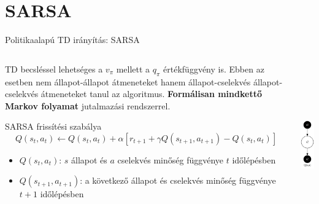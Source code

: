 \documentclass[english, aspectratio=169]{beamer}
\makeatletter
\let\origtableofcontents=\tableofcontents
\def\tableofcontents{\@ifnextchar[{\origtableofcontents}{\gobbletableofcontents}}
\def\gobbletableofcontents#1{\origtableofcontents}
\makeatother
\begin{document}
\section{SARSA}

\begin{frame}
\tableofcontents[currentsection]
\end{frame}

\begin{frame}{Politikaalapú TD irányítás: SARSA}
\begin{columns}
\begin{column}{.8\textwidth}
TD becsléssel lehetséges a $v_\pi$ mellett a $q_\pi$ értékfüggvény is. Ebben az esetben nem állapot-állapot átmeneteket hanem állapot-cselekvés állapot-cselekvés átmeneteket tanul az algoritmus. \textbf{Formálisan mindkettő Markov folyamat} jutalmazási rendszerrel. \par\smallskip
\begin{center}
\begin{block}{SARSA frissítési szabálya}
\[
Q(s_t,a_t) \leftarrow Q(s_t,a_t) + \alpha \left[ r_{t+1} + \gamma Q(s_{t+1},a_{t+1}) - Q(s_t,a_t) \right]
\]
\vspace{-0.5cm}
\begin{itemize}
	\item $Q(s_t,a_t)$: $s$ állapot és $a$ cselekvés minőség függvénye $t$ időlépésben
	\item $Q(s_{t+1},a_{t+1})$: a következő állapot és cselekvés minőség függvénye $t+1$ időlépésben
\end{itemize}
\end{block}
\end{center}
\end{column}
\begin{column}{.2\textwidth}
\begin{center}
\includegraphics[height=7cm, keepaspectratio]{graphs/mc_td_5.png}
\end{center}
\end{column}
\end{columns}
\end{frame}
\end{document}
